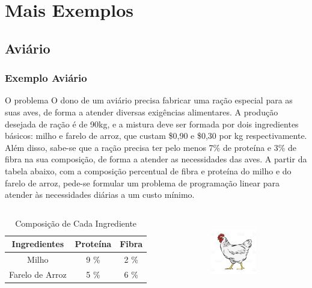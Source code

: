 \documentclass{beamer}
\begin{document}
\section{Mais Exemplos}

\subsection{Aviário}

\begin{frame}
	\frametitle{Exemplo Aviário}
	\begin{block}{O problema}
		\scriptsize
		O dono de um aviário precisa fabricar uma ração especial para as suas aves, de forma a atender diversas exigências alimentares. A produção desejada de ração é de 90kg, e a mistura deve ser formada por dois ingredientes básicos: milho e farelo de arroz, que custam \$0,90 e \$0,30 por kg respectivamente. Além disso, sabe-se que a ração precisa ter pelo menos 7\% de proteína e 3\% de fibra na sua composição, de forma a atender as necessidades das aves. A partir da tabela abaixo, com a composição percentual de fibra e proteína do milho e do farelo de arroz, pede-se formular um problema de programação linear para atender às necessidades diárias a um custo mínimo. 
	\end{block}
	\begin{columns}
		\begin{column}{0.7\textwidth}
			\begin{table}
				\scriptsize
				\caption{Composição de Cada Ingrediente}
				\begin{tabular}{| c | c | c |}
					\hline
					\textbf{Ingredientes} & \textbf{Proteína} & \textbf{Fibra} \\
					\hline
					Milho				  & 9 \%              & 2 \% \\
					Farelo de Arroz		  & 5 \%			  & 6 \% \\
					\hline
				\end{tabular}
			\end{table}
		\end{column}
		\begin{column}{0.3\textwidth}
				\centering
				\includegraphics[width=2cm,height=3cm]{aviario.jpg}
		\end{column}
	\end{columns}
\end{frame}
\end{document}
